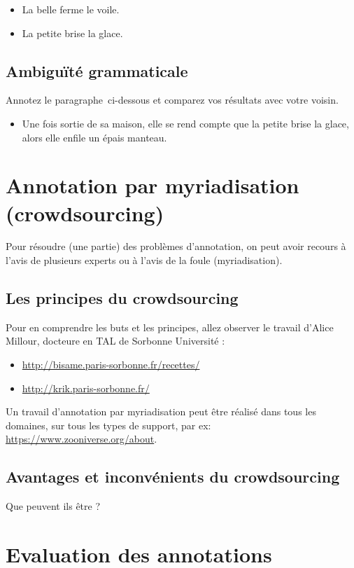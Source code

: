 \begin{itemize}
  \item La belle ferme le voile.
  \item La petite brise la glace.
\end{itemize}

\subsection{Ambiguïté grammaticale}

Annotez le paragraphe ci-dessous et comparez vos résultats avec votre voisin.
\begin{itemize}
  \item Une fois sortie de sa maison, elle se rend compte que la petite brise la glace, alors elle enfile un épais manteau.
\end{itemize}


  \section{Annotation par myriadisation (crowdsourcing)}
Pour résoudre (une partie) des problèmes d'annotation, on peut avoir recours à l'avis de plusieurs experts ou à l'avis de la foule (myriadisation).

  \subsection{Les principes du crowdsourcing}
 Pour en comprendre les buts et les principes, allez observer le travail d'Alice Millour, docteure en TAL de Sorbonne Université :
\begin{itemize}
\item \url{http://bisame.paris-sorbonne.fr/recettes/} 
\item \url{http://krik.paris-sorbonne.fr/} 
\end{itemize}
 
 Un travail d'annotation par myriadisation peut être réalisé dans tous les domaines, sur tous les types de support, par ex: \url{https://www.zooniverse.org/about}.

  \subsection{ Avantages et inconvénients du crowdsourcing}

 Que peuvent ils être ?




  \section{Evaluation des annotations}

